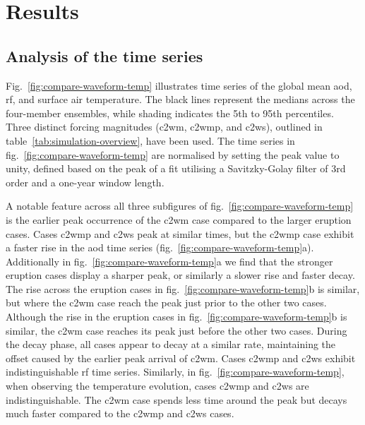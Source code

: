 \documentclass{ametsocV6.1}
\begin{document}
\section{Results}\label{sec:results}


\subsection{Analysis of the time series}

Fig.~\ref{fig:compare-waveform-temp} illustrates time series of the global mean
\gls{aod}, \gls{rf}, and surface air temperature. The black lines represent the medians
across the four-member ensembles, while shading indicates the 5th to 95th percentiles.
Three distinct forcing magnitudes (\gls{c2wm}, \gls{c2wmp}, and \gls{c2ws}), outlined in
table~\ref{tab:simulation-overview}, have been used. The time series in
fig.~\ref{fig:compare-waveform-temp} are normalised by setting the peak value to unity,
defined based on the peak of a fit utilising a Savitzky-Golay filter of 3rd order and a
one-year window length.

A notable feature across all three subfigures of fig.~\ref{fig:compare-waveform-temp} is
the earlier peak occurrence of the \gls{c2wm} case compared to the larger eruption
cases. Cases \gls{c2wmp} and \gls{c2ws} peak at similar times, but the \gls{c2wmp} case
exhibit a faster rise in the \gls{aod} time series
(fig.~\ref{fig:compare-waveform-temp}a). Additionally in
fig.~\ref{fig:compare-waveform-temp}a we find that the stronger eruption cases display a
sharper peak, or similarly a slower rise and faster decay. The rise across the eruption
cases in fig.~\ref{fig:compare-waveform-temp}b is similar, but where the \gls{c2wm} case
reach the peak just prior to the other two cases. Although the rise in the eruption
cases in fig.~\ref{fig:compare-waveform-temp}b is similar, the \gls{c2wm} case reaches
its peak just before the other two cases. During the decay phase, all cases appear to
decay at a similar rate, maintaining the offset caused by the earlier peak arrival of
\gls{c2wm}. Cases \gls{c2wmp} and \gls{c2ws} exhibit indistinguishable \gls{rf} time
series. Similarly, in fig.~\ref{fig:compare-waveform-temp}, when observing the
temperature evolution, cases \gls{c2wmp} and \gls{c2ws} are indistinguishable. The
\gls{c2wm} case spends less time around the peak but decays much faster compared to the
\gls{c2wmp} and \gls{c2ws} cases.
\end{document}
